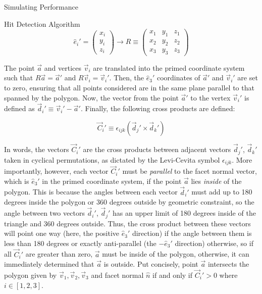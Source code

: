 \begin{section}{Simulating Performance}
\begin{subsection}{Hit Detection Algorithm}
\begin{equation}
    \hat{e}_i' = \begin{pmatrix} x_i \\ y_i \\ z_i \end{pmatrix}
    \rightarrow
    R \equiv \begin{pmatrix} 
        x_1 & y_1 & z_1 \\
        x_2 & y_2 & z_2 \\
        x_3 & y_3 & z_3
    \end{pmatrix}
\end{equation}

\noindent The point $\vec{a}$ and vertices $\vec{v}_i$ are translated into the primed coordinate system such that $R\vec{a} = \vec{a}'$ and $R\vec{v}_i = \vec{v}_{i}'$. Then, the $\hat{e}_3'$ coordinates of $\vec{a}'$ and $\vec{v}_i'$ are set to zero, ensuring that all points considered are in the same plane parallel to that spanned by the polygon. Now, the vector from the point $\vec{a}'$ to the vertex $\vec{v}_{i}'$ is defined as $\vec{d}_{i}' \equiv \vec{v}_{i}'-\vec{a}'$. Finally, the following cross products are defined:

\begin{equation}
    \vec{C}_{i}' \equiv \epsilon_{ijk}(\vec{d}_{j}'\times\vec{d}_{k}')
\end{equation}

\noindent In words, the vectors $\vec{C}_{i}'$ are the cross products between adjacent vectors $\vec{d}_{j}'$, $\vec{d}_{k}'$ taken in cyclical permutations, as dictated by the Levi-Cevita symbol $\epsilon_{ijk}$. More importantly, however, each vector $\vec{C}_{i}'$ must be \textit{parallel} to the facet normal vector, which is $\hat{e}_{3}'$ in the primed coordinate system, if the point $\vec{a}$ lies \textit{inside} of the polygon. This is because the angles between each vector $\vec{d}_{i}'$ must add up to 180 degrees inside the polygon or 360 degrees outside by geometric constraint, so the angle between two vectors $\vec{d}_{i}'$, $\vec{d}_{j}'$ has an upper limit of 180 degrees inside of the triangle and 360 degrees outside. Thus, the cross product between these vectors will point one way (here, the positive $\hat{e}_3'$ direction) if the angle between them is less than 180 degrees or exactly anti-parallel (the $-\hat{e}_3'$ direction) otherwise, so if all $\vec{C}_{i}'$ are greater than zero, $\vec{a}$ must be inside of the polygon, otherwise, it can immediately determined that $\vec{a}$ is outside. Put concisely, point $\vec{a}$ intersects the polygon given by $\vec{v}_1, \vec{v}_2, \vec{v}_3$ and facet normal $\hat{n}$ if and only if $\vec{C}_{i}' > 0$ where $i\in[1,2,3]$.


\end{subsection}
\end{section}
